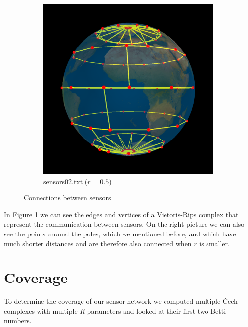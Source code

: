 \documentclass[a4paper, 12pt]{article}
\begin{document}
\begin{figure}[H]
{\begin{subfigure}[b]{0.50\textwidth}
                \includegraphics[width=\textwidth]{../images/connections02}
                \caption{sensors02.txt ($r=0.5$)}
            \end{subfigure}
        }
        \caption{Connections between sensors}
        \label{connections}
\end{figure}
In Figure \ref{connections} we can see the edges and vertices of a Vietoris-Rips complex that represent the communication between sensors. On the right picture we can also see the points around the poles, which we mentioned before, and which have much shorter distances and are therefore also connected when $r$ is smaller.

\section{Coverage}
To determine the coverage of our sensor network we computed multiple Čech complexes with multiple $R$ parameters and looked at their first two Betti numbers. 
\end{document}
